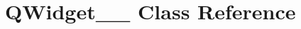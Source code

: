 \hypertarget{classGUI_1_1Player_1_1QWidget____11}{}\section{Q\+Widget\+\_\+\+\_ Class Reference}
\label{classGUI_1_1Player_1_1QWidget____11}

